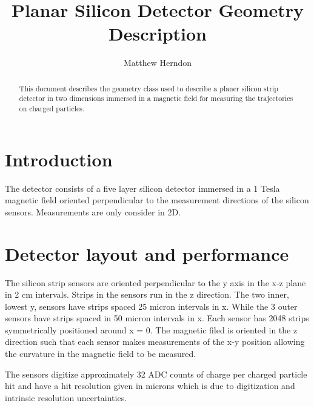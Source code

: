 \documentclass[aps,prd,superscriptaddress,floatfix]{revtex4}
\begin{document}


\title{  
\vspace{0.5cm}
Planar Silicon Detector Geometry Description
}

\author {Matthew Herndon}

\address{University of Wisconsin, Madison, Wisconsin, USA}


\begin{abstract}
\vskip 0.5cm
\noindent
This document describes the geometry class used to describe a planer silicon strip
detector in two dimensions immersed in a magnetic field for measuring
the trajectories on charged particles.  
\end{abstract}
\maketitle


\vspace{0.3cm}

\section{Introduction}
The detector consists of a five layer silicon detector immersed in a 1
Tesla magnetic field oriented perpendicular to the measurement
directions of the silicon sensors.  Measurements are only consider in
2D.


\section{Detector layout and performance}
The silicon strip sensors are oriented perpendicular to the y axis in
the x-z plane in 2 cm intervals.  Strips in the sensors run in the z
direction.  The two inner, lowest y,  sensors have strips spaced 25 micron
intervals in x. While the 3 outer sensors have strips spaced in 50 micron
intervals in x.  Each sensor has 2048 strips symmetrically positioned
around x = 0.  The magnetic filed is oriented in the z direction such
that each sensor makes measurements of the x-y position allowing
the curvature in the magnetic field to be measured.

The sensors digitize approximately 32 ADC counts of charge per charged
particle hit and have a hit resolution given in microns which is due to
digitization and intrinsic resolution uncertainties.
\end{document}
